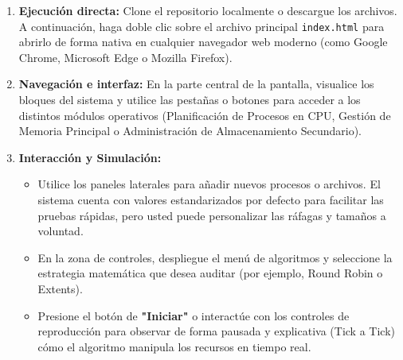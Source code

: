 \documentclass[12pt,a4paper]{article}
\begin{document}
\begin{enumerate}
    \item \textbf{Ejecución directa:} Clone el repositorio localmente o descargue los archivos. A continuación, haga doble clic sobre el archivo principal \texttt{index.html} para abrirlo de forma nativa en cualquier navegador web moderno (como Google Chrome, Microsoft Edge o Mozilla Firefox).
    \item \textbf{Navegación e interfaz:} En la parte central de la pantalla, visualice los bloques del sistema y utilice las pestañas o botones para acceder a los distintos módulos operativos (Planificación de Procesos en CPU, Gestión de Memoria Principal o Administración de Almacenamiento Secundario).
    \item \textbf{Interacción y Simulación:} 
    \begin{itemize}
        \item Utilice los paneles laterales para añadir nuevos procesos o archivos. El sistema cuenta con valores estandarizados por defecto para facilitar las pruebas rápidas, pero usted puede personalizar las ráfagas y tamaños a voluntad.
        \item En la zona de controles, despliegue el menú de algoritmos y seleccione la estrategia matemática que desea auditar (por ejemplo, Round Robin o Extents).
        \item Presione el botón de \textbf{"Iniciar"} o interactúe con los controles de reproducción para observar de forma pausada y explicativa (Tick a Tick) cómo el algoritmo manipula los recursos en tiempo real.
    \end{itemize}
\end{enumerate}
\end{document}
